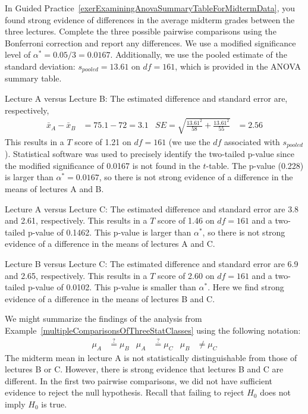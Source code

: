 \begin{example}{In Guided Practice~\ref{exerExaminingAnovaSummaryTableForMidtermData}, you found strong evidence of differences in the average midterm grades between the three lectures. Complete the three possible pairwise comparisons using the Bonferroni correction and report any differences.} \label{multipleComparisonsOfThreeStatClasses}
We use a modified significance level of $\alpha^* = 0.05/3 = 0.0167$. Additionally, we use the pooled estimate of the standard deviation: $s_{pooled}=13.61$ on $df=161$, which is provided in the ANOVA summary table.

Lecture A versus Lecture B: The estimated difference and standard error are, respectively,
\begin{align*}
\bar{x}_A - \bar{x}_{B} &= 75.1 - 72 = 3.1
	&SE = \sqrt{\frac{13.61^2}{58} + \frac{13.61^2}{55}} &= 2.56
\end{align*}
This results in a $T$ score of 1.21 on $df = 161$ (we use the $df$ associated with $s_{pooled}$). Statistical software was used to precisely identify the two-tailed p-value since the modified significance of 0.0167 is not found in the $t$-table. The p-value (0.228) is larger than $\alpha^*=0.0167$, so there is not strong evidence of a difference in the means of lectures A and B.

Lecture A versus Lecture C: The estimated difference and standard error are 3.8 and 2.61, respectively. This results in a $T$ score of 1.46 on $df = 161$ and a two-tailed p-value of 0.1462. This p-value is larger than $\alpha^*$, so there is not strong evidence of a difference in the means of lectures A and C.

Lecture B versus Lecture C: The estimated difference and standard error are 6.9 and 2.65, respectively. This results in a $T$ score of 2.60 on $df = 161$ and a two-tailed p-value of 0.0102. This p-value is smaller than $\alpha^*$. Here we find strong evidence of a difference in the means of lectures B and C.
\end{example}

We might summarize the findings of the analysis from Example~\ref{multipleComparisonsOfThreeStatClasses} using the following notation:
\begin{align*}
\mu_A &\stackrel{?}{=} \mu_B
	&\mu_A &\stackrel{?}{=} \mu_C
	&\mu_B &\neq \mu_C
\end{align*}
The midterm mean in lecture A is not statistically distinguishable from those of lectures B or C. However, there is strong evidence that lectures B and C are different. In the first two pairwise comparisons, we did not have sufficient evidence to reject the null hypothesis. Recall that failing to reject $H_0$ does not imply $H_0$ is true.


